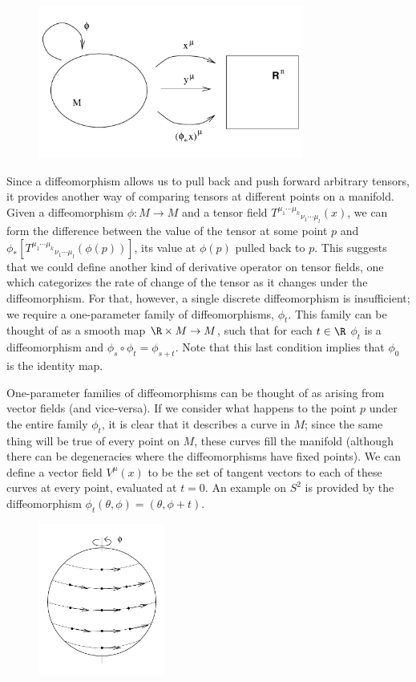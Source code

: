 \documentclass[12pt]{article}
\begin{document}
\begin{figure}[h]
  \centerline{
  \includegraphics[height=5cm]{pdf/five5}}
\end{figure}

Since a diffeomorphism allows us to pull back and push forward arbitrary
tensors, it provides another way of comparing tensors at different 
points on a manifold.  Given a diffeomorphism $\phi:M\rightarrow M$ and
a tensor field $T^{\mu_1 \cdots \mu_k}{}_{\nu_1 \cdots \mu_l}(x)$, we
can form the difference between the value of the tensor at some point
$p$ and $\phi_*[T^{\mu_1 \cdots \mu_k}{}_{\nu_1 \cdots \mu_l}(\phi(p))]$,
its value at $\phi(p)$ pulled back to $p$.
This suggests that we could define another kind of derivative operator
on tensor fields, one which categorizes the rate of change of the
tensor as it changes under the diffeomorphism.  For that, however, a
single discrete diffeomorphism is insufficient; we require a one-parameter
family of diffeomorphisms, $\phi_t$.  This family can be thought of as
a smooth map $\R\times M\rightarrow M$, such that for each $t\in\R$
$\phi_t$ is a diffeomorphism and $\phi_s\circ\phi_t=\phi_{s+t}$.  Note
that this last condition implies that $\phi_0$ is the identity map.

One-parameter families of diffeomorphisms can be thought of as arising
from vector fields (and vice-versa).  If we consider what happens to
the point $p$ under the entire family $\phi_t$, it is clear that it
describes a curve in $M$; since the same thing will be true of every
point on $M$, these curves fill the manifold (although there can be
degeneracies where the diffeomorphisms have fixed points).  We can define
a vector field $V^\mu(x)$ to be the set of tangent vectors to each of
these curves at every point, evaluated at $t=0$.  An example on $S^2$
is provided by the diffeomorphism $\phi_t(\theta,\phi)=(\theta,\phi+t)$.

\begin{figure}
  \centerline{
  \includegraphics[height=5cm]{pdf/five6}}
\end{figure}
\end{document}
